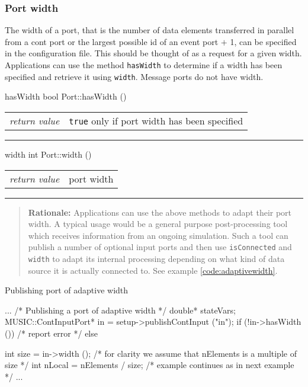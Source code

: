 \documentclass[a4paper,twoside]{report}
\makeatletter
\newenvironment{rationale}%
{\par\begin{quote}\textbf{Rationale:}}%
{\par\end{quote}}
\newenvironment{parameters}%
{\begin{tabular}{@{\hspace{2em}}lp{0.6\textwidth}}}%
{\end{tabular}\par\vspace{1mm}\par\hrule\par\vspace{5mm}}
\makeatother
\begin{document}
\subsubsection{Port width}
\label{sec:width}

The width of a port, that is the number of data
elements transferred in parallel from a cont port or the largest
possible id of an event port $+$ 1, can be specified in the
configuration file.  This should be thought of as a request for a
given width.  Applications can use the method \lstinline|hasWidth| to
determine if a width has been specified and retrieve it using
\lstinline|width|.  Message ports do not have width.

\pagebreak
{}
\begin{head}{hasWidth}
  bool Port::hasWidth ()
\end{head}
\begin{parameters}
  \emph{return value} & \lstinline|true| only if port width has been
                         specified \\
\end{parameters}

\begin{head}{width}
  int Port::width ()
\end{head}
\begin{parameters}
  \emph{return value} & port width \\
\end{parameters}

\begin{rationale}
  Applications can use the above methods to adapt their port width.  A
  typical usage would be a general purpose post-processing tool which
  receives information from an ongoing simulation.  Such a tool can
  publish a number of optional input ports and then use
  \lstinline|isConnected| and \lstinline|width| to adapt its internal
  processing depending on what kind of data source it is actually
  connected to.  See example \ref{code:adaptivewidth}.
\end{rationale}


\begin{code}{Publishing port of adaptive width\label{code:adaptivewidth}}
{
  ...
  /* Publishing a port of adaptive width */
  double* stateVars;
  MUSIC::ContInputPort* in =
     setup->publishContInput ("in");
  if (!in->hasWidth ())
    /* report error */
  else
    {
      int size = in->width ();
      /* for clarity we assume that nElements
         is a multiple of size */
      int nLocal = nElements / size;
      /* example continues as in next example */
      ...
      
    }
}
\end{code}
\end{document}
